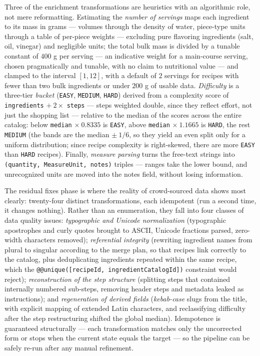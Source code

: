 Three of the enrichment transformations are heuristics with an algorithmic role, not mere reformatting. Estimating the \textit{number of servings} maps each ingredient to its mass in grams --- volumes through the density of water, piece-type units through a table of per-piece weights --- excluding pure flavoring ingredients (salt, oil, vinegar) and negligible units; the total bulk mass is divided by a tunable constant of \(400\) g per serving --- an indicative weight for a main-course serving, chosen pragmatically and tunable, with no claim to nutritional value --- and clamped to the interval \([1, 12]\), with a default of \(2\) servings for recipes with fewer than two bulk ingredients or under \(200\) g of usable data. \textit{Difficulty} is a three-tier \textit{bucket} (\texttt{EASY}, \texttt{MEDIUM}, \texttt{HARD}) derived from a complexity score of \texttt{ingredients} \(+\ 2 \times\) \texttt{steps} --- steps weighted double, since they reflect effort, not just the shopping list --- relative to the median of the scores across the entire catalog: below \texttt{median} \(\times\ 0.8335\) is \texttt{EASY}, above \texttt{median} \(\times\ 1.1665\) is \texttt{HARD}, the rest \texttt{MEDIUM} (the bands are the median \(\pm\ 1/6\), so they yield an even split only for a uniform distribution; since recipe complexity is right-skewed, there are more \texttt{EASY} than \texttt{HARD} recipes). Finally, \textit{measure parsing} turns the free-text strings into \texttt{(quantity, \texttt{MeasureUnit}, notes)} triples --- ranges take the lower bound, and unrecognized units are moved into the notes field, without losing information.

The residual fixes phase is where the reality of crowd-sourced data shows most clearly: twenty-four distinct transformations, each idempotent (run a second time, it changes nothing). Rather than an enumeration, they fall into four classes of data quality issues: \textit{typographic and Unicode normalization} (typographic apostrophes and curly quotes brought to ASCII, Unicode fractions parsed, zero-width characters removed); \textit{referential integrity} (rewriting ingredient names from plural to singular according to the merge plan, so that recipes link correctly to the catalog, plus deduplicating ingredients repeated within the same recipe, which the \texttt{@@unique([recipeId, ingredientCatalogId])} constraint would reject); \textit{reconstruction of the step structure} (splitting steps that contained internally numbered sub-steps, removing header steps and metadata leaked as instructions); and \textit{regeneration of derived fields} (\textit{kebab-case} slugs from the title, with explicit mapping of extended Latin characters, and reclassifying difficulty after the step restructuring shifted the global median). Idempotence is guaranteed structurally --- each transformation matches only the uncorrected form or stops when the current state equals the target --- so the pipeline can be safely re-run after any manual refinement.

